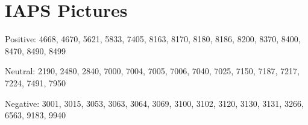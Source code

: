 \appendix
\section{IAPS Pictures}
Positive: 4668, 4670, 5621, 5833, 7405, 8163, 8170, 8180, 8186, 8200, 8370, 8400, 8470, 8490, 8499

Neutral: 2190, 2480, 2840, 7000, 7004, 7005, 7006, 7040, 7025, 7150, 7187, 7217, 7224, 7491, 7950

Negative: 3001, 3015, 3053, 3063, 3064, 3069, 3100, 3102, 3120, 3130, 3131, 3266, 6563, 9183, 9940
